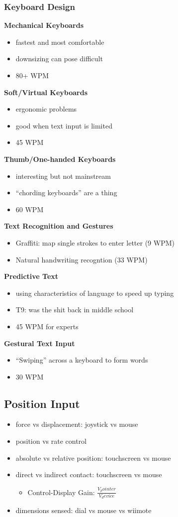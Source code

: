 \documentclass[]{article}
\theoremstyle{definition}
\begin{document}
	\subsubsection{Keyboard Design}
	\textbf{Mechanical Keyboards}
	\begin{itemize}
		\item fastest and most comfortable
		\item downsizing can pose difficult
		\item 80+ WPM
	\end{itemize}
	\textbf{Soft/Virtual Keyboards}
	\begin{itemize}
		\item ergonomic problems
		\item good when text input is limited
		\item 45 WPM
	\end{itemize}
	\textbf{Thumb/One-handed Keyboards}
	\begin{itemize}
		\item interesting but not mainstream
		\item ``chording keyboards'' are a thing
		\item 60 WPM
	\end{itemize}
	\textbf{Text Recognition and Gestures}
	\begin{itemize}
		\item Graffiti: map single strokes to enter letter (9 WPM)
		\item Natural handwriting recogntion (33 WPM)
	\end{itemize}
	\textbf{Predictive Text}
	\begin{itemize}
		\item using characteristics of language to speed up typing
		\item T9: was the shit back in middle school\
		\item 45 WPM for experts
	\end{itemize}
	\textbf{Gestural Text Input}
	\begin{itemize}
		\item ``Swiping'' across a keyboard to form words
		\item 30 WPM
	\end{itemize}

	\subsection{Position Input}
	\begin{itemize}
		\item force vs displacement: joystick vs mouse
		\item position vs rate control
		\item absolute vs relative position: touchscreen vs mouse
		\item direct vs indirect contact: touchscreen vs mouse
			\begin{itemize}
				\item Control-Display Gain: $\frac{V_pointer}{V_device}$
			\end{itemize}
		\item dimensions sensed: dial vs mouse vs wiimote
	\end{itemize}
\end{document}
